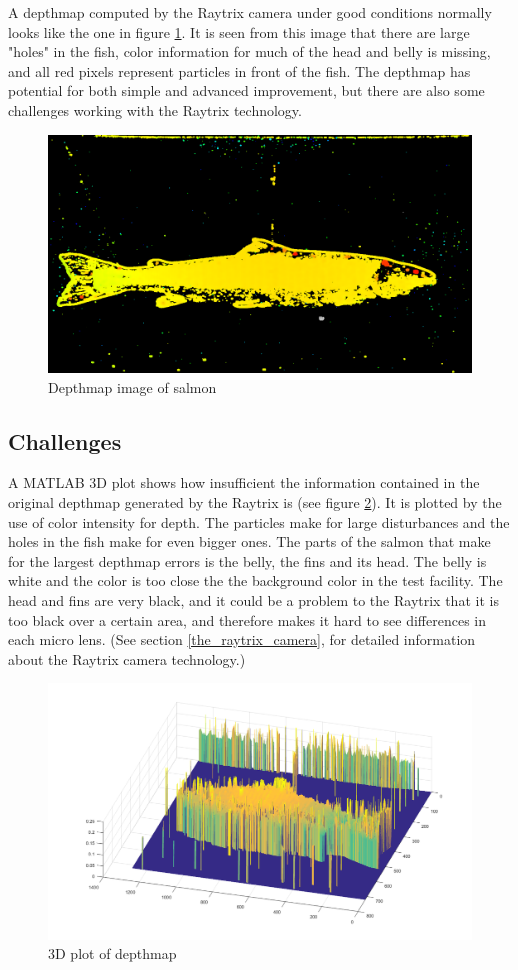 A depthmap computed by the Raytrix camera under good conditions normally looks like the one in figure \ref{fig:depthmap82}. It is seen from this image that there are large "holes" in the fish, color information for much of the head and belly is missing, and all red pixels represent particles in front of the fish. The depthmap has potential for both simple and advanced improvement, but there are also some challenges working with the Raytrix technology.

\begin{figure}[H]
    \centering
    \includegraphics[width=.7\linewidth]{images/aim_of_study/depthmap82}
    \caption{Depthmap image of salmon}
    \label{fig:depthmap82}
\end{figure}






\subsection{Challenges}

A MATLAB 3D plot shows how insufficient the information contained in the original depthmap generated by the Raytrix is (see figure \ref{fig:matlab3D}). It is plotted by the use of color intensity for depth. The particles make for large disturbances and the holes in the fish make for even bigger ones. The parts of the salmon that make for the largest depthmap errors is the belly, the fins and its head. The belly is white and the color is too close the the background color in the test facility. The head and fins are very black, and it could be a problem to the Raytrix that it is too black over a certain area, and therefore makes it hard to see differences in each micro lens. (See section \ref{the_raytrix_camera}, for detailed information about the Raytrix camera technology.)

\begin{figure}[H]
    \centering
    \includegraphics[width=.7\linewidth]{images/aim_of_study/original_3D_87}
    \caption{3D plot of depthmap}
    \label{fig:matlab3D}
\end{figure}

